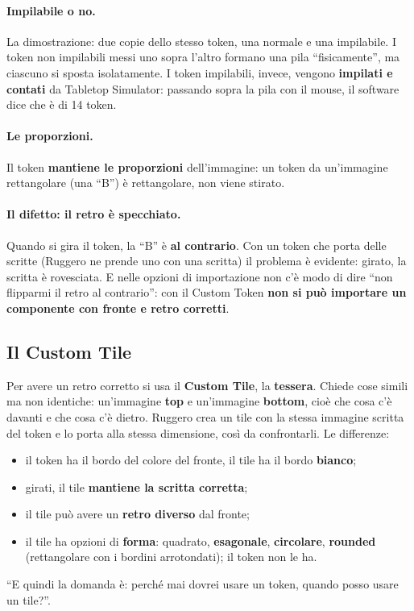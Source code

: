 \paragraph{Impilabile o no.} La dimostrazione: due copie dello stesso token, una
normale e una impilabile. I token non impilabili messi uno sopra l'altro formano una
pila ``fisicamente'', ma ciascuno si sposta isolatamente. I token impilabili, invece,
vengono \textbf{impilati e contati} da Tabletop Simulator: passando sopra la pila con
il mouse, il software dice che è di 14 token.

\paragraph{Le proporzioni.} Il token \textbf{mantiene le proporzioni} dell'immagine: un
token da un'immagine rettangolare (una ``B'') è rettangolare, non viene stirato.

\paragraph{Il difetto: il retro è specchiato.} Quando si gira il token, la ``B'' è
\textbf{al contrario}. Con un token che porta delle scritte (Ruggero ne prende uno con
una scritta) il problema è evidente: girato, la scritta è rovesciata. E nelle opzioni
di importazione non c'è modo di dire ``non flipparmi il retro al contrario'': con il
Custom Token \textbf{non si può importare un componente con fronte e retro corretti}.

\subsection{Il Custom Tile}
\label{a8:sec:tile}

Per avere un retro corretto si usa il \textbf{Custom Tile}, la \textbf{tessera}. Chiede
cose simili ma non identiche: un'immagine \textbf{top} e un'immagine \textbf{bottom},
cioè che cosa c'è davanti e che cosa c'è dietro. Ruggero crea un tile con la stessa
immagine scritta del token e lo porta alla stessa dimensione, così da confrontarli.
Le differenze:
\begin{itemize}
  \item il token ha il bordo del colore del fronte, il tile ha il bordo
        \textbf{bianco};
  \item girati, il tile \textbf{mantiene la scritta corretta};
  \item il tile può avere un \textbf{retro diverso} dal fronte;
  \item il tile ha opzioni di \textbf{forma}: quadrato, \textbf{esagonale},
        \textbf{circolare}, \textbf{rounded} (rettangolare con i bordini
        arrotondati); il token non le ha.
\end{itemize}
``E quindi la domanda è: perché mai dovrei usare un token, quando posso usare un tile?''.

